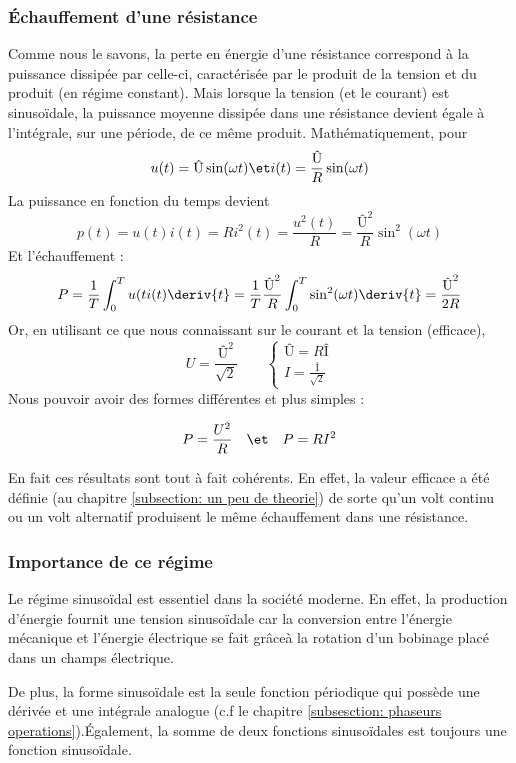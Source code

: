 \documentclass[12pt,a4paper]{article}
\newcommand{\I}{\text{Î} }
\newcommand{\U}{\text{Û} }
\begin{document}
\subsubsection{Échauffement d'une résistance}
Comme nous le savons, la perte en énergie d'une résistance correspond à la puissance dissipée par celle-ci, caractérisée par le produit de la tension et du produit (en régime constant). Mais lorsque la tension (et le courant) est sinusoïdale, la puissance moyenne dissipée dans une résistance devient égale à l'intégrale, sur une période, de ce même produit. Mathématiquement, pour 
\[u(t) = \U \sin(\omega t) \et i(t) = \frac{\U}{R}\sin(\omega t)\]
La puissance en fonction du temps devient
\[p(t) = u(t)i(t) = Ri^2(t) = \frac{u^2(t)}{R} = \frac{\U^2}{R}\sin^2(\omega t)\]
Et l'échauffement :
\[P = \frac{1}{T}\int_0^T u(ti(t) \deriv{t} = \frac{1}{T}\frac{\U^2}{R}\int_0^T \sin^2(\omega t) \deriv{t} = \frac{\U^2}{2R}\]
Or, en utilisant ce que nous connaissant sur le courant et la tension (efficace), 
\[U = \frac{\U^2}{\sqrt{2}}  \qquad \left\{\begin{array}{l}
\U = R\I\\
I = \frac{\I}{\sqrt{2}}
\end{array}\right.\]
Nous pouvoir avoir des formes différentes et plus simples :	
\begin{boite}
	\begin{equation}
		P = \frac{U^2}{R} \quad \et \quad P = RI^2
	\end{equation}
\end{boite}
En fait ces résultats sont tout à fait cohérents. En effet, la valeur efficace a été définie (au chapitre \ref{subsection: un peu de theorie}) de sorte qu'un volt continu ou un volt alternatif produisent le même échauffement dans une résistance.
\subsubsection{Importance de ce régime}
Le régime sinusoïdal est essentiel dans la société moderne. En effet, la production d'énergie fournit une tension sinusoïdale car la conversion entre l'énergie mécanique et l'énergie électrique se fait grâceà la rotation d'un bobinage placé dans un champs électrique. 

De plus, la forme sinusoïdale est la seule fonction périodique qui possède une dérivée et une intégrale analogue (c.f le chapitre \ref{subsesction: phaseurs operations}).Également, la somme de deux fonctions sinusoïdales est toujours une fonction sinusoïdale.
\end{document}
